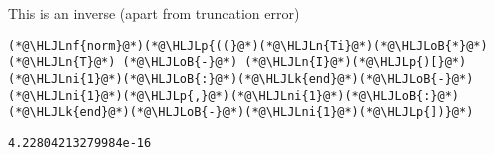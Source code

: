 \documentclass[12pt,landscape]{article}
\newcommand{\HLJLk}[1]{\textcolor[RGB]{148,91,176}{\textbf{#1}}}
\newcommand{\HLJLn}[1]{#1}
\newcommand{\HLJLnf}[1]{\textcolor[RGB]{66,102,213}{#1}}
\newcommand{\HLJLni}[1]{\textcolor[RGB]{59,151,46}{#1}}
\newcommand{\HLJLoB}[1]{\textcolor[RGB]{102,102,102}{\textbf{#1}}}
\newcommand{\HLJLp}[1]{#1}
\begin{document}
{This is an inverse (apart from truncation error)


\begin{lstlisting}
(*@\HLJLnf{norm}@*)(*@\HLJLp{((}@*)(*@\HLJLn{Ti}@*)(*@\HLJLoB{*}@*)(*@\HLJLn{T}@*) (*@\HLJLoB{-}@*) (*@\HLJLn{I}@*)(*@\HLJLp{)[}@*)(*@\HLJLni{1}@*)(*@\HLJLoB{:}@*)(*@\HLJLk{end}@*)(*@\HLJLoB{-}@*)(*@\HLJLni{1}@*)(*@\HLJLp{,}@*)(*@\HLJLni{1}@*)(*@\HLJLoB{:}@*)(*@\HLJLk{end}@*)(*@\HLJLoB{-}@*)(*@\HLJLni{1}@*)(*@\HLJLp{])}@*)
\end{lstlisting}

\begin{lstlisting}
4.22804213279984e-16
\end{lstlisting}


}
\end{document}
